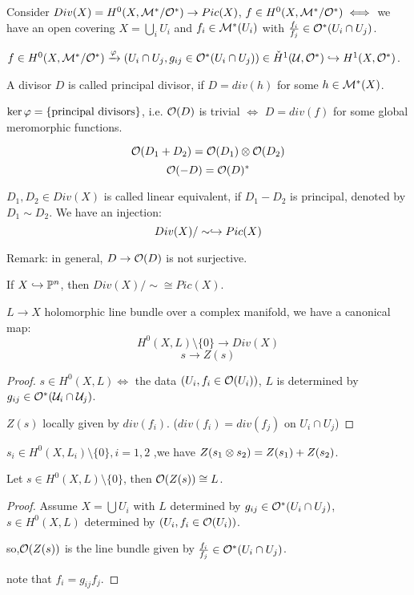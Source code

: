 Consider $Div(X)=H^0(X,\mathcal{M}^*/\mathcal{O}^*)\to Pic(X)$,
$f\in H^0(X,\mathcal{M}^*/\mathcal{O}^*)\iff$ we have an open covering
$X=\bigcup_i U_i$ and $f_i\in\mathcal{M}^*(U_i)$ with
$\frac{f_i}{f_j}\in\mathcal{O}^*(U_i\cap U_j)$.

$f\in H^0(X,\mathcal{M}^*/\mathcal{O}^*)\xrightarrow{\varphi}
(U_i\cap U_j,g_{ij}\in\mathcal{O}^*(U_i\cap U_j))
\in \check{H}^1(\mathcal{U},\mathcal{O}^*)\hookrightarrow H^1(X,\mathcal{O}^*)$.

\begin{definition}
A divisor $D$ is called principal divisor, if $D= div(h)$ for some
$h\in\mathcal{M}^*(X)$.
\end{definition}

\begin{prop}
$\ker\varphi=\{\text{principal divisors}\}$,
i.e. $\mathcal{O}(D)$ is trivial $\iff$ $D= div(f)$ for some global meromorphic functions.
\end{prop}

\begin{prop}
$$\mathcal{O}(D_1+D_2)=\mathcal{O}(D_1)\otimes\mathcal{O}(D_2)$$
$$\mathcal{O}(-D)=\mathcal{O}(D)^*$$
\end{prop}

\begin{definition}
$D_1,D_2\in Div(X)$ is called linear equivalent, if $D_1-D_2$ is principal,
denoted by $D_1\sim D_2$. We have an injection:
$$Div(X)/\sim\hookrightarrow Pic(X)$$
\end{definition}

Remark: in general, $D\to\mathcal{O}(D)$ is not surjective.

If $X\hookrightarrow\mathbb{P}^n$, then $Div(X)/\sim\cong Pic(X)$.

\begin{prop}
$L\to X$ holomorphic line bundle over a complex manifold,
we have a canonical map:
$$H^0(X,L)\setminus\{0\}\to Div(X)$$
$$s\to Z(s)$$
\end{prop}

\begin{proof}
$s\in H^0(X,L)\iff$ the data $(U_i,f_i\in\mathcal{O}(U_i))$,
$L$ is determined by $g_{ij}\in\mathcal{O}^*(\mathcal{U}_i\cap\mathcal{U}_j)$.

$Z(s)$ locally given by $div(f_i)$.
($div(f_i)=div(f_j)$ on $U_i\cap U_j$)
\end{proof}

\begin{prop}
$s_i\in H^0(X,L_i)\setminus\{0\}, i=1,2$ ,we have
$Z(s_1\otimes s_2)=Z(s_1)+Z(s_2)$.
\end{prop}

\begin{prop}
Let $s\in H^0(X,L)\setminus\{0\}$, then $\mathcal{O}(Z(s))\cong L$.
\end{prop}
\begin{proof}
Assume $X=\bigcup U_i$ with $L$ determined by $g_{ij}\in\mathcal{O}^*(U_i\cap U_j)$,
$s\in H^0(X,L)$ determined by $(U_i,f_i\in\mathcal{O}(U_i))$.

so,$\mathcal{O}(Z(s))$ is the line bundle given by $\frac{f_i}{f_j}\in\mathcal{O}^*(U_i\cap U_j)$.

note that $f_i=g_{ij}f_j$.
\end{proof}

